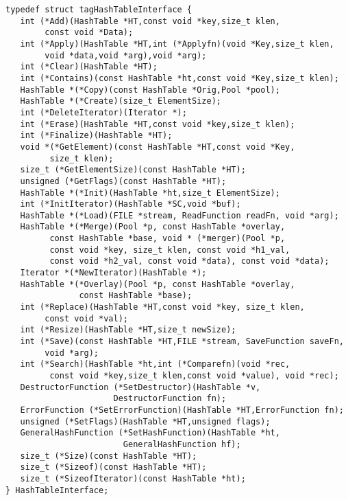 \begin{verbatim}
typedef struct tagHashTableInterface {
   int (*Add)(HashTable *HT,const void *key,size_t klen,
        const void *Data);
   int (*Apply)(HashTable *HT,int (*Applyfn)(void *Key,size_t klen,
        void *data,void *arg),void *arg);
   int (*Clear)(HashTable *HT);
   int (*Contains)(const HashTable *ht,const void *Key,size_t klen);
   HashTable *(*Copy)(const HashTable *Orig,Pool *pool);
   HashTable *(*Create)(size_t ElementSize);
   int (*DeleteIterator)(Iterator *);
   int (*Erase)(HashTable *HT,const void *key,size_t klen);
   int (*Finalize)(HashTable *HT);
   void *(*GetElement)(const HashTable *HT,const void *Key,
         size_t klen);
   size_t (*GetElementSize)(const HashTable *HT);
   unsigned (*GetFlags)(const HashTable *HT);
   HashTable *(*Init)(HashTable *ht,size_t ElementSize);
   int (*InitIterator)(HashTable *SC,void *buf);
   HashTable *(*Load)(FILE *stream, ReadFunction readFn, void *arg);
   HashTable *(*Merge)(Pool *p, const HashTable *overlay,
         const HashTable *base, void * (*merger)(Pool *p,
         const void *key, size_t klen, const void *h1_val,
         const void *h2_val, const void *data), const void *data);
   Iterator *(*NewIterator)(HashTable *);
   HashTable *(*Overlay)(Pool *p, const HashTable *overlay,
               const HashTable *base);
   int (*Replace)(HashTable *HT,const void *key, size_t klen,
        const void *val);
   int (*Resize)(HashTable *HT,size_t newSize);
   int (*Save)(const HashTable *HT,FILE *stream, SaveFunction saveFn,
        void *arg);
   int (*Search)(HashTable *ht,int (*Comparefn)(void *rec,
         const void *key,size_t klen,const void *value), void *rec);
   DestructorFunction (*SetDestructor)(HashTable *v,
                      DestructorFunction fn);
   ErrorFunction (*SetErrorFunction)(HashTable *HT,ErrorFunction fn);
   unsigned (*SetFlags)(HashTable *HT,unsigned flags);
   GeneralHashFunction (*SetHashFunction)(HashTable *ht,
                        GeneralHashFunction hf);
   size_t (*Size)(const HashTable *HT);
   size_t (*Sizeof)(const HashTable *HT);
   size_t (*SizeofIterator)(const HashTable *ht);
} HashTableInterface;
\end{verbatim}
